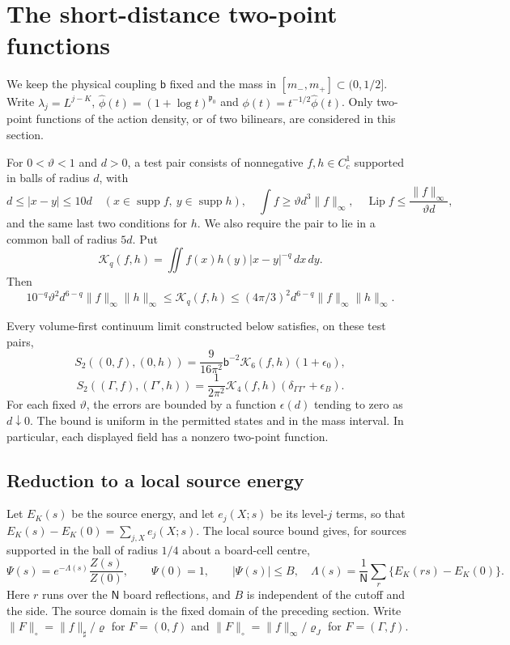 \documentclass[11pt,letterpaper,reqno]{amsart}
\makeatletter
\theoremstyle{definition}
\newcommand{\ms@minorstart}{%
  \pushQED{\qed}\renewcommand{\qedsymbol}{$\blacksquare$}}
\newenvironment{proposition}[1][]{\ms@minorstart\ms@proposition[#1]}
  {\popQED\endms@proposition}
\theoremstyle{remark}
\makeatother
\begin{document}
\section{The short-distance two-point functions}
\label{sec:qcd-two-point-laws}

We keep the physical coupling $\mathsf b$ fixed and the mass in
$[m_-,m_+]\subset(0,1/2]$. Write
$\lambda_j=L^{j-K}$, $\widehat\phi(t)=(1+\log t)^{\mathfrak p_0}$
and $\phi(t)=t^{-1/2}\widehat\phi(t)$.
Only two-point functions of the action density, or of two bilinears,
are considered in this section.

For $0<\vartheta<1$ and $d>0$, a test pair consists of nonnegative
$f,h\in C^1_c$ supported in balls of radius $d$, with
\[
 d\le |x-y|\le10d\quad(x\in\operatorname{supp}f,\ y\in\operatorname{supp}h),
 \quad \int f\ge\vartheta d^3\|f\|_\infty,
 \quad \operatorname{Lip}f\le\frac{\|f\|_\infty}{\vartheta d},
\]
and the same last two conditions for $h$. We also require the pair to lie in a common
ball of radius $5d$. Put
\[
 \mathcal K_q(f,h)=\iint f(x)h(y)|x-y|^{-q}\,dx\,dy.
\]
Then
\begin{equation}\label{eq:qcd-template-lower}
 10^{-q}\vartheta^2d^{6-q}\|f\|_\infty\|h\|_\infty
 \le\mathcal K_q(f,h)
 \le(4\pi/3)^2d^{6-q}\|f\|_\infty\|h\|_\infty.
\end{equation}

\begin{proposition}[The two leading kernels]\label{C-408-27}
Every volume-first continuum limit constructed below satisfies, on
these test pairs,
\[
 S_2((0,f),(0,h))=\frac9{16\pi^2}\mathsf b^{-2}
                  \mathcal K_6(f,h)(1+\epsilon_0),
\]
\[
 S_2((\Gamma,f),(\Gamma',h))=\frac1{2\pi^2}
                  \mathcal K_4(f,h)(\delta_{\Gamma\Gamma'}+\epsilon_B).
\]
For each fixed $\vartheta$, the errors are bounded by a function
$\epsilon(d)$ tending to zero as $d\downarrow0$. The bound is
uniform in the permitted states and in the mass interval. In
particular, each displayed field has a nonzero two-point function.
\end{proposition}

\subsection{Reduction to a local source energy}

Let $E_K(s)$ be the source energy, and let $e_j(X;s)$ be its
level-$j$ terms, so that $E_K(s)-E_K(0)=\sum_{j,X}e_j(X;s)$.
The local source bound gives, for sources supported in the ball
of radius $1/4$ about a board-cell centre,
\begin{equation}\label{eq:qcd-cell-holomorphic-bound}
 \Psi(s)=e^{-\Lambda(s)}\frac{Z(s)}{Z(0)},\qquad
 \Psi(0)=1,\qquad |\Psi(s)|\le B,
 \quad
 \Lambda(s)=\frac1{\mathsf N}\sum_{r}\{E_K(rs)-E_K(0)\}.
\end{equation}
Here $r$ runs over the $\mathsf N$ board reflections, and $B$
is independent of the cutoff and the side. The source domain is
the fixed domain of the preceding section. Write
$\|F\|_\circ=\|f\|_\sharp/\varrho$ for $F=(0,f)$ and
$\|F\|_\circ=\|f\|_\infty/\varrho_J$ for $F=(\Gamma,f)$.
\end{document}

